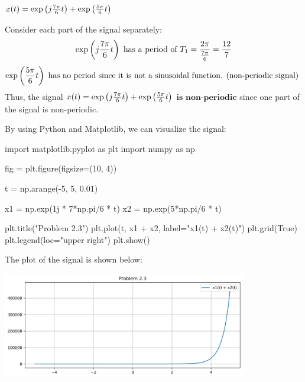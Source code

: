 \documentclass[a4paper, 10pt]{article}
\begin{document}
\newpage

\begin{subproblems}[start=3]
    \item \( x(t) = \exp \left( j\frac{7\pi}{6}t \right) +  \exp \left( \frac{5\pi}{6}t \right) \)
\end{subproblems}

\begin{solution}
Consider each part of the signal separately:
\[
\exp \left( j\frac{7\pi}{6}t \right) \text{ has a period of } T_1 = \frac{2\pi}{\frac{7\pi}{6}} = \frac{12}{7}
\]
\[
\exp \left( \frac{5\pi}{6}t \right) \text{ has no period since it is not a sinusoidal function. (non-periodic signal) }
\]
Thus, the signal \( x(t) = \exp \left( j\frac{7\pi}{6}t \right) +  \exp \left( \frac{5\pi}{6}t \right) \) \( \boxed{\textbf{is non-periodic}} \) since one part of the signal is non-periodic.

\vspace{5mm}

By using Python and Matplotlib, we can visualize the signal:
\begin{codingbox}
import matplotlib.pyplot as plt
import numpy as np

fig = plt.figure(figsize=(10, 4))

t = np.arange(-5, 5, 0.01)

x1 = np.exp(1j * 7*np.pi/6 * t)
x2 = np.exp(5*np.pi/6 * t)

plt.title("Problem 2.3")
plt.plot(t, x1 + x2, label="x1(t) + x2(t)")
plt.grid(True)
plt.legend(loc="upper right")
plt.show()
\end{codingbox}
The plot of the signal is shown below:
\begin{center}
    \includegraphics[width=0.8\textwidth]{images/problem_2_3.png}
\end{center}
\end{solution}

\newpage
\end{document}

